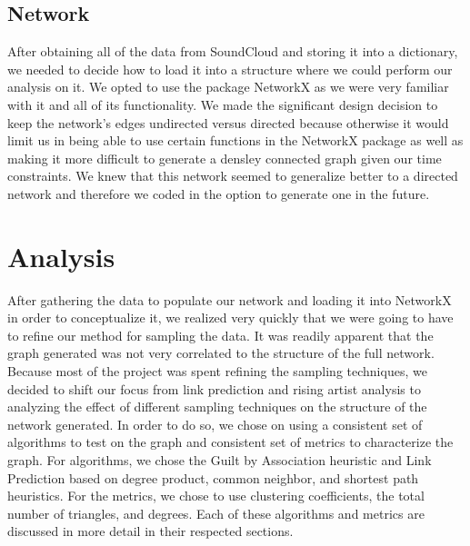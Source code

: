 \documentclass{article}
\begin{document}
\subsection{Network}

After obtaining all of the data from SoundCloud and storing it into a dictionary, we needed to decide how to load it into a structure where we could perform our analysis on it. We opted to use the package NetworkX as we were very familiar with it and all of its functionality.  We made the significant design decision to keep the network's edges undirected versus directed because otherwise it would limit us in being able to use certain functions in the NetworkX package as well as making it more difficult to generate a densley connected graph given our time constraints.  We knew that this network seemed to generalize better to a directed network and therefore we coded in the option to generate one in the future.  

\section{Analysis}

After gathering the data to populate our network and loading it into NetworkX in order to conceptualize it, we realized very quickly that we were going to have to refine our method for sampling the data.  It was readily apparent that the graph generated was not very correlated to the structure of the full network.  Because most of the project was spent refining the sampling techniques, we decided to shift our focus from link prediction and rising artist analysis to analyzing the effect of different sampling techniques on the structure of the network generated.  In order to do so, we chose on using a consistent set of algorithms to test on the graph and consistent set of metrics to characterize the graph.  For algorithms, we chose the Guilt by Association heuristic and Link Prediction based on degree product, common neighbor, and shortest path heuristics.  For the metrics, we chose to use clustering coefficients, the total number of triangles, and degrees.  Each of these algorithms and metrics are discussed in more detail in their respected sections.
\end{document}
